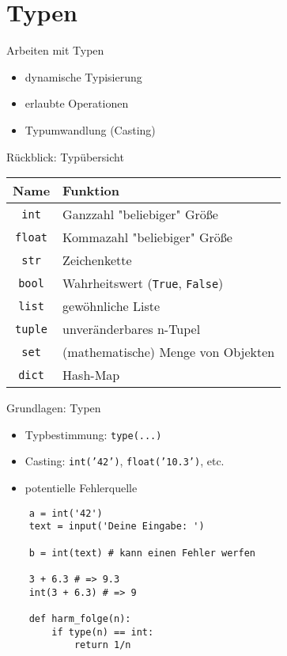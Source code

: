 \section{Typen}
\begin{frame}{Arbeiten mit Typen}
	\begin{itemize}
		\item dynamische Typisierung
		\item erlaubte Operationen
		\item Typumwandlung (Casting)
	\end{itemize}
\end{frame}

\begin{frame}{Rückblick: Typübersicht}
        \begin{tabular}{c|l}
		Name & Funktion \\ \hline
		\texttt{int} & Ganzzahl "beliebiger" Größe \\
		\texttt{float} & Kommazahl "beliebiger" Größe \\
		\texttt{str} & Zeichenkette \\
		\texttt{bool} & Wahrheitswert (\texttt{True}, \texttt{False})\\ \hline
		\texttt{list} & gewöhnliche Liste \\
		\texttt{tuple} & unveränderbares n-Tupel \\
		\texttt{set} & (mathematische) Menge von Objekten \\
		\texttt{dict} & Hash-Map \\
	\end{tabular}
\end{frame}

\begin{frame}[fragile]{Grundlagen: Typen}
	\begin{itemize}
		\item Typbestimmung: \texttt{type(...)}
		\item Casting: \texttt{int('42')}, \texttt{float('10.3')}, etc.
		\item potentielle Fehlerquelle
	\end{itemize}

	\begin{lstlisting}
	a = int('42')
	text = input('Deine Eingabe: ')

	b = int(text) # kann einen Fehler werfen

	3 + 6.3 # => 9.3
	int(3 + 6.3) # => 9

	def harm_folge(n):
		if type(n) == int:
			return 1/n
	\end{lstlisting}



\end{frame}

